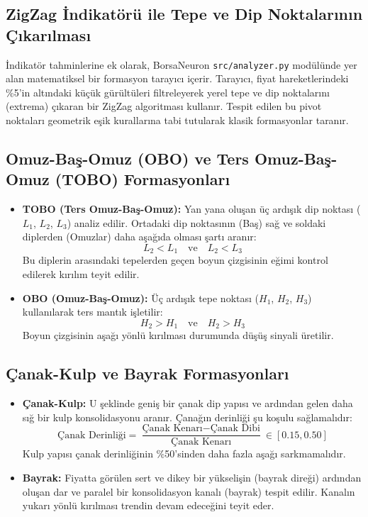\documentclass[12pt,a4paper]{report}
\begin{document}
\subsection{ZigZag İndikatörü ile Tepe ve Dip Noktalarının Çıkarılması}
İndikatör tahminlerine ek olarak, BorsaNeuron \texttt{src/analyzer.py} modülünde yer alan matematiksel bir formasyon tarayıcı içerir. Tarayıcı, fiyat hareketlerindeki \%5'in altındaki küçük gürültüleri filtreleyerek yerel tepe ve dip noktalarını (extrema) çıkaran bir ZigZag algoritması kullanır. Tespit edilen bu pivot noktaları geometrik eşik kurallarına tabi tutularak klasik formasyonlar taranır.

\subsection{Omuz-Baş-Omuz (OBO) ve Ters Omuz-Baş-Omuz (TOBO) Formasyonları}
\begin{itemize}
    \item \textbf{TOBO (Ters Omuz-Baş-Omuz):} Yan yana oluşan üç ardışık dip noktası ($L_1$, $L_2$, $L_3$) analiz edilir. Ortadaki dip noktasının (Baş) sağ ve soldaki diplerden (Omuzlar) daha aşağıda olması şartı aranır:
    \begin{equation}
    L_2 < L_1 \quad \text{ve} \quad L_2 < L_3
    \end{equation}
    Bu diplerin arasındaki tepelerden geçen boyun çizgisinin eğimi kontrol edilerek kırılım teyit edilir.
    \item \textbf{OBO (Omuz-Baş-Omuz):} Üç ardışık tepe noktası ($H_1$, $H_2$, $H_3$) kullanılarak ters mantık işletilir:
    \begin{equation}
    H_2 > H_1 \quad \text{ve} \quad H_2 > H_3
    \end{equation}
    Boyun çizgisinin aşağı yönlü kırılması durumunda düşüş sinyali üretilir.
\end{itemize}

\subsection{Çanak-Kulp ve Bayrak Formasyonları}
\begin{itemize}
    \item \textbf{Çanak-Kulp:} U şeklinde geniş bir çanak dip yapısı ve ardından gelen daha sığ bir kulp konsolidasyonu aranır. Çanağın derinliği şu koşulu sağlamalıdır:
    \begin{equation}
    \text{Çanak Derinliği} = \frac{\text{Çanak Kenarı} - \text{Çanak Dibi}}{\text{Çanak Kenarı}} \in [0.15, 0.50]
    \end{equation}
    Kulp yapısı çanak derinliğinin \%50'sinden daha fazla aşağı sarkmamalıdır.
    \item \textbf{Bayrak:} Fiyatta görülen sert ve dikey bir yükselişin (bayrak direği) ardından oluşan dar ve paralel bir konsolidasyon kanalı (bayrak) tespit edilir. Kanalın yukarı yönlü kırılması trendin devam edeceğini teyit eder.
\end{itemize}
\end{document}
